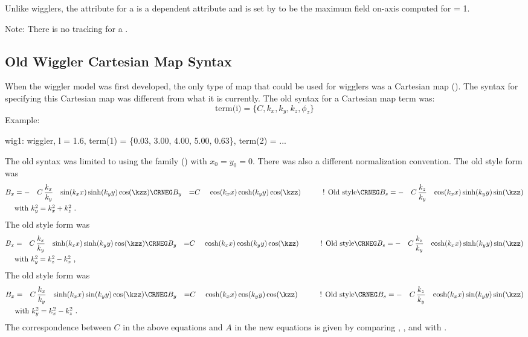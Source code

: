{Unlike  wigglers, the  attribute for a   
is a dependent attribute and is 
set by \bmad to be the maximum field on-axis computed for  = 1.

Note: There is no  tracking for a  . 

\subsection{Old Wiggler Cartesian Map Syntax}
\label{s:old.wiggler}

When the wiggler model was first developed, the only type of map that could be used for  wigglers was a Cartesian map (). The syntax for specifying this Cartesian
map was different from what it is currently. The old syntax for a Cartesian map term was:
\begin{equation}
  \text{term(i)} = \{C, k_x, k_y, k_z, \phi_z \}
\end{equation}
Example:
\begin{example}
  wig1: wiggler, l = 1.6, 
        term(1) = \{0.03, 3.00, 4.00, 5.00, 0.63\},
        term(2) = ...
\end{example}

The old syntax was limited to using the   family ()
with $x_0 = y_0 = 0$. There was also a different normalization convention. The old style
 form was
\begin{alignat}{5}
  B_x &= -& C \, &\dfrac{k_x}{k_y} & \sin(k_x x) \sinh(k_y y) \cos(\kzz) &\CRNEG
  B_y &=  & C \, &                 & \cos(k_x x) \cosh(k_y y) \cos(\kzz) &\qquad \text{! Old style} \CRNEG
  B_s &= -& C \, &\dfrac{k_z}{k_y} & \cos(k_x x) \sinh(k_y y) \sin(\kzz) &\label{f1} \\
  & \makebox[1pt][l]{with $k_y^2 = k_x^2 + k_z^2$ .} &&&&  \nonumber
\end{alignat}
The old style  form was
\begin{alignat}{5}
  B_x &=  & C \, &\dfrac{k_x}{k_y} & \sinh(k_x x) \sinh(k_y y) \cos(\kzz) &\CRNEG
  B_y &=  & C \, &                 & \cosh(k_x x) \cosh(k_y y) \cos(\kzz) &\qquad \text{! Old style} \CRNEG
  B_s &= -& C \, &\dfrac{k_z}{k_y} & \cosh(k_x x) \sinh(k_y y) \sin(\kzz) &\label{f2} \\
  & \makebox[1pt][l]{with $k_y^2 = k_z^2 - k_x^2$ ,} &&&&  \nonumber
\end{alignat}
The old style  form was
\begin{alignat}{5}
  B_x &=  & C \, &\dfrac{k_x}{k_y} & \sinh(k_x x) \sin(k_y y) \cos(\kzz) &\CRNEG
  B_y &=  & C \, &                 & \cosh(k_x x) \cos(k_y y) \cos(\kzz) &\qquad \text{! Old style} \CRNEG
  B_s &= -& C \, &\dfrac{k_z}{k_y} & \cosh(k_x x) \sin(k_y y) \sin(\kzz) &\label{f3} \\
  & \makebox[1pt][l]{with $k_y^2 = k_x^2 - k_z^2$ .} &&&& \nonumber
\end{alignat}
The correspondence between $C$ in the above equations and $A$ in the new equations is
given by comparing , , and  with .

}
